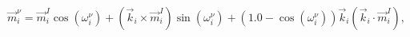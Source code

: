 \documentclass[preview]{standalone}
\begin{document}
\begin{varwidth}{50in}
  \begin{equation}
    \vec{m}_i^{\nu} = \vec{m}_i^{I} \cos(\omega_i^{\nu})
    + (\vec{k}_i \times \vec{m}_i^{I}) \sin(\omega_i^{\nu})
    + (1.0-\cos(\omega_i^{\nu})) \vec{k}_i (\vec{k}_i\cdot
    \vec{m}_i^{I})
  , \nonumber
  \end{equation}
\end{varwidth}
\end{document}
